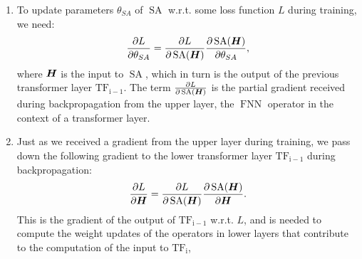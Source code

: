 \documentclass[11pt,a4paper]{article}
\newcommand\op[1]{\operatorname{#1}}
\begin{document}
\begin{enumerate}[label=(\alph*)]
          input.
          Concretely, given a vector $\vx\in\bb{R}^d$, the layer normalization
          operation is given by:
          \begin{align}
              \op{LN}(\vx) & = \frac{\vx - \mu}{\sigma} \gamma + \beta
          \end{align}
          where $\gamma$ and $\beta$ are learned parameters.
          This operation can be seen as a form of data centering and is commonly
          used so keep training stable, sometimes at the cost of performance on
          some downtream tasks.
          It can be applied anywhere in a network, including anywhere in a
          transformer layer.
          In fact, a common variant is the \emph{pre-norm} transformer, which
          applies layer normalization \emph{before} each of $\op{SA}$ and
          $\op{FNN}$.
          Typically, this variant also includes a single final layer
          normalization operation applied only to the output of the last
          transformer layer.
    \item To update parameters $\theta_{SA}$ of $\op{SA}$ w.r.t. some loss
          function $L$ during training, we need:
          \begin{align}\label{eq:weight_gradient}
              \frac{\partial L}{\partial \theta_{SA}} = \frac{\partial L}{\partial \op{SA}(\mH)}\frac{\partial \op{SA}(\mH)}{\partial \theta_{SA}},
          \end{align}
          where ${\boldsymbol{H}}$ is the input to $\op{SA}$, which in turn is the output of
          the previous transformer layer $\op{TF_{i-1}}$.
          The term $\frac{\partial L}{\partial \op{SA}(\mH)}$ is the partial
          gradient received during backpropagation from the upper layer, the
          $\op{FNN}$ operator in the context of a transformer layer.
    \item Just as we received a gradient from the upper layer during training,
          we pass down the following gradient to the lower transformer layer
          $\op{TF_{i-1}}$ during backpropagation:
          \begin{align}\label{eq:input_gradient}
              \frac{\partial L}{\partial \mH} = \frac{\partial L}{\partial \op{SA}(\mH)}\frac{\partial \op{SA}(\mH)}{\partial \mH}.
          \end{align}
          This is the gradient of the output of $\op{TF_{i-1}}$ w.r.t. $L$, and
          is needed to compute the weight updates of the operators in lower
          layers that contribute to the computation of the input to $\op{TF_i}$,

\end{enumerate}
\end{document}
